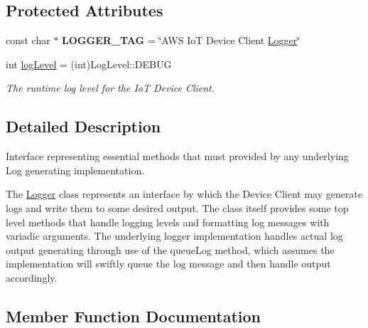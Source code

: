 \subsection*{Protected Attributes}
\begin{DoxyCompactItemize}
\item 
\mbox{\label{class_aws_1_1_iot_1_1_device_client_1_1_logging_1_1_logger_a742d59a36a966d1c593f5091e4ab6ed7}} 
const char $\ast$ {\bfseries L\+O\+G\+G\+E\+R\+\_\+\+T\+AG} = \char`\"{}A\+WS IoT Device Client \hyperlink{class_aws_1_1_iot_1_1_device_client_1_1_logging_1_1_logger}{Logger}\char`\"{}
\item 
\mbox{\label{class_aws_1_1_iot_1_1_device_client_1_1_logging_1_1_logger_ada1785780bfd79d789b9edaa798cf4b5}} 
int \hyperlink{class_aws_1_1_iot_1_1_device_client_1_1_logging_1_1_logger_ada1785780bfd79d789b9edaa798cf4b5}{log\+Level} = (int)Log\+Level\+::\+D\+E\+B\+UG
\begin{DoxyCompactList}\small\item\em The runtime log level for the IoT Device Client. \end{DoxyCompactList}\end{DoxyCompactItemize}


\subsection{Detailed Description}
Interface representing essential methods that must provided by any underlying Log generating implementation. 

The \hyperlink{class_aws_1_1_iot_1_1_device_client_1_1_logging_1_1_logger}{Logger} class represents an interface by which the Device Client may generate logs and write them to some desired output. The class itself provides some top level methods that handle logging levels and formatting log messages with variadic arguments. The underlying logger implementation handles actual log output generating through use of the queue\+Log method, which assumes the implementation will swiftly queue the log message and then handle output accordingly. 

\subsection{Member Function Documentation}
\mbox{\label{class_aws_1_1_iot_1_1_device_client_1_1_logging_1_1_logger_ad64e2decc9c73a45717f1d87bb3d404a}} 
